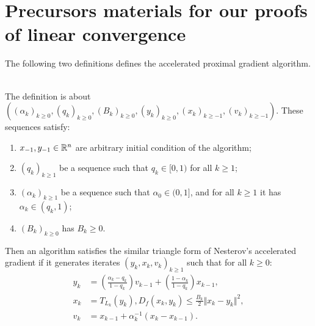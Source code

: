 \documentclass[12pt]{article}
\begin{document}
\section{Precursors materials for our proofs of linear convergence}
    The following two definitions defines the accelerated proximal gradient algorithm. 
    \begin{definition}\;\label{def:st-apg}\\
        The definition is about $((\alpha_k)_{k \ge 0}, (q_k)_{k \ge 0}, (B_k)_{k \ge 0}, (y_k)_{k \ge 0}, (x_k)_{k \ge -1}, (v_k)_{k \ge -1})$. 
        These sequences satisfy:
        \begin{enumerate}[nosep]
            \item $x_{-1}, y_{- 1}\in \mathbb R^n$ are arbitrary initial condition of the algorithm;
            \item $(q_k)_{k \ge 1}$ be a sequence such that $q_k \in [0, 1)$ for all $k \ge 1$;
            \item $(\alpha_k)_{k \ge 1}$ be a sequence such that $\alpha_0 \in (0, 1]$, and for all $k \ge 1$ it has $\alpha_k \in (q_k, 1)$;
            \item $(B_k)_{k \ge 0}$ has $B_k \ge 0$. 
        \end{enumerate}
        Then an algorithm satisfies the similar triangle form of Nesterov's accelerated gradient if it generates iterates $(y_k, x_k, v_k)_{k \ge 1}$ such that for all $k\ge 0$: 
        \begin{align*}
            y_k &= \left(\frac{\alpha_k - q_k}{1 - q_k}\right)v_{k - 1} 
            + \left(\frac{1 - \alpha_k}{1 - q_k}\right) x_{k - 1},
            \\
            x_k &= T_{L_k}(y_k), D_f(x_k, y_k) \le \frac{B_k}{2}\Vert x_k - y_k\Vert^2, 
            \\
            v_k &= x_{k - 1} + \alpha_k^{-1}(x_k - x_{k - 1}). 
        \end{align*}
    \end{definition}
\end{document}
